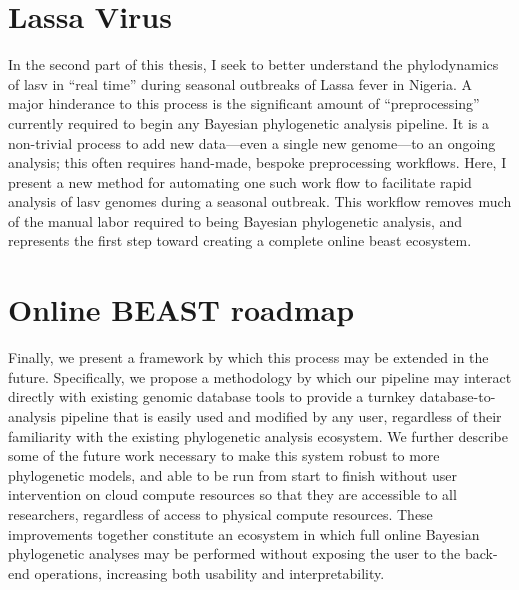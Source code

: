 \section{Lassa Virus}
In the second part of this thesis, I seek to better understand the phylodynamics of \gls{lasv} in ``real time'' during seasonal outbreaks of Lassa fever in Nigeria.
A major hinderance to this process is the significant amount of ``preprocessing'' currently required to begin any Bayesian phylogenetic analysis pipeline.
It is a non-trivial process to add new data---even a single new genome---to an ongoing analysis; this often requires hand-made, bespoke preprocessing workflows.
Here, I present a new method for automating one such work flow to facilitate rapid analysis of \gls{lasv} genomes during a seasonal outbreak.
This workflow removes much of the manual labor required to being Bayesian phylogenetic analysis, and represents the first step toward creating a complete online \gls{beast} ecosystem.

\section{Online BEAST roadmap}

Finally, we present a framework by which this process may be extended in the future.
Specifically, we propose a methodology by which our pipeline may interact directly with existing genomic database tools to provide a turnkey database-to-analysis pipeline that is easily used and modified by any user, regardless of their familiarity with the existing phylogenetic analysis ecosystem.
We further describe some of the future work necessary to make this system robust to more phylogenetic models, and able to be run from start to finish without user intervention on cloud compute resources so that they are accessible to all researchers, regardless of access to physical compute resources.
These improvements together constitute an ecosystem in which full online Bayesian phylogenetic analyses may be performed without exposing the user to the back-end operations, increasing both usability and interpretability.


\cleardoublepage

